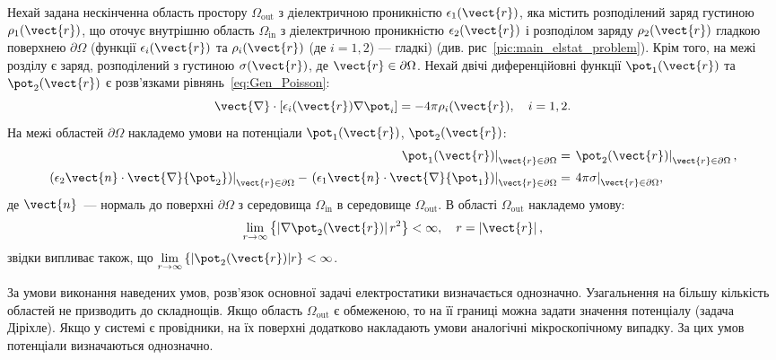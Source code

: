 \begin{Theory}
	Нехай задана нескінченна область простору $\Omega_\text{out}$ з діелектричною проникністю $\epsilon_1(\vect{r})$, яка містить розподілений заряд густиною $\rho_1(\vect{r})$, що оточує внутрішню область $\Omega_\text{in}$ з діелектричною проникністю $\epsilon_2(\vect{r})$ і розподілом заряду $\rho_2(\vect{r})$ гладкою поверхнею $\partial\Omega$ (функції $\epsilon_i(\vect{r})$ та $\rho_i(\vect{r})$ (де $i= 1,2$) --- гладкі) (див. рис~\ref{pic:main_elstat_problem}). Крім того, на межі розділу є заряд, розподілений з густиною $\sigma(\vect{r})$, де $\vect{r} \in \partial\Omega$. Нехай двічі диференційовні функції $\pot_1(\vect{r})$ та $\pot_2(\vect{r})$  є розв'язками рівнянь~\eqref{eq:Gen_Poisson}:
	\begin{equation}\label{eq:Gen_Poisson1}
		\vect{\nabla} \cdot \left[ {\epsilon_i(\vect{r})\nabla {\pot_i}} \right] =  - 4\pi \rho_i(\vect{r}), \quad i =1,2.
	\end{equation}
	На межі областей $\partial\Omega$  накладемо умови на потенціали $\pot_1(\vect{r})$, $\pot_2(\vect{r})$:
	\begin{align}
		\left. \pot_1(\vect{r})\right|_{\vect{r}\in\partial\Omega}                                                                                                                                                                                              & =  \left.\pot_2(\vect{r})\right|_{\vect{r}\in\partial\Omega},        \\
		{\left. {\left( {{\epsilon _2}{\vect{n}} \cdot \vect{\nabla} {\pot_2}} \right)} \right|_{{\vect{r}} \in \partial \Omega }} - {\left. {\left( {{\epsilon _1}{\vect{n}} \cdot \vect{\nabla} {\pot_1}} \right)} \right|_{{\vect{r}} \in \partial \Omega }} & = {\left. {4\pi \sigma } \right|_{{\vect{r}} \in \partial \Omega }},
	\end{align}
	де $\vect{n}$~--- нормаль до поверхні $\partial\Omega$  з середовища $\Omega_\text{in}$   в середовище  $\Omega_\text{out}$.
	В області  $\Omega_\text{out}$ накладемо умову:
	\begin{equation}\label{}
		\lim\limits_{r \to \infty } \left\{ {\left| {\nabla {\pot _2}({\vect{r}})} \right|{r^2}} \right\} < \infty ,\quad r = \left| {\vect{r}} \right|,
	\end{equation}
	звідки випливає також, що $\lim\limits_{r \to \infty } \left\{ | \pot _2(\vect{r}) |r \right\} < \infty$.

	За умови виконання наведених умов,  розв'язок основної задачі електростатики визначається однозначно. Узагальнення на більшу кількість областей не призводить до складнощів. Якщо область $\Omega_\text{out}$ є обмеженою, то на її границі можна задати значення потенціалу (задача Діріхле). Якщо у системі є провідники, на їх поверхні додатково накладають умови аналогічні  мікроскопічному випадку.  За цих умов потенціали визначаються однозначно.
\end{Theory}


